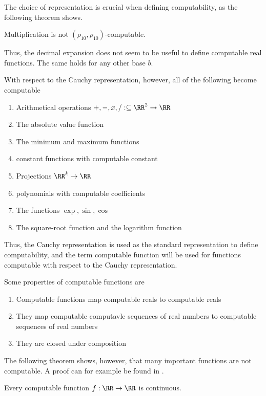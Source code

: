 The choice of representation is crucial when defining computability, as the
following theorem shows.
\begin{theorem}
Multiplication is not $(\rho_{10}, \rho_{10})$-computable.
\end{theorem}
Thus, the decimal expansion does not seem to be useful to define computable
real functions.
The same holds for any other base $b$.

With respect to the Cauchy representation, however, all of the following become
computable
\begin{enumerate}
\item Arithmetical operations $+,-,x,/ : \subseteq \RR^2 \to \RR$
\item The absolute value function
\item The minimum and maximum functions
\item constant functions with computable constant
\item Projections $\RR^k \to \RR$ 
\item polynomials with computable coefficients
\item The functions $\exp, \sin, \cos$
\item The square-root function and the logarithm function
\end{enumerate}
Thus, the Cauchy representation is used as the standard representation to
define computability, and the term computable function will be used for
functions computable with respect to the Cauchy representation.

Some  properties of computable functions are
\begin{enumerate}
  \item Computable functions map computable reals to computable reals
  \item They map computable computavle sequences of real numbers to computable
    sequences of real numbers
  \item They are closed under composition
\end{enumerate}

The following theorem shows, however, that many important functions are not computable. 
A proof can for example be found in \cite{Wei}.
\begin{theorem}
  Every computable function $f: \RR \to \RR$ is continuous.
\end{theorem}

